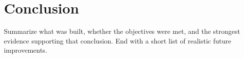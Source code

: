 \chapter{Conclusion}
\label{chap:conclusion}

Summarize what was built, whether the objectives were met, and the strongest
evidence supporting that conclusion. End with a short list of realistic future
improvements.
